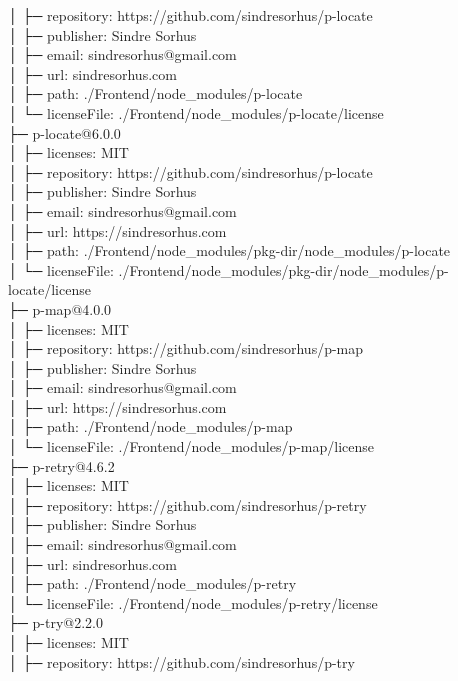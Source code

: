 │  ├─ repository: https://github.com/sindresorhus/p-locate\\
│  ├─ publisher: Sindre Sorhus\\
│  ├─ email: sindresorhus@gmail.com\\
│  ├─ url: sindresorhus.com\\
│  ├─ path: ./Frontend/node\_modules/p-locate\\
│  └─ licenseFile: ./Frontend/node\_modules/p-locate/license\\
├─ p-locate@6.0.0\\
│  ├─ licenses: MIT\\
│  ├─ repository: https://github.com/sindresorhus/p-locate\\
│  ├─ publisher: Sindre Sorhus\\
│  ├─ email: sindresorhus@gmail.com\\
│  ├─ url: https://sindresorhus.com\\
│  ├─ path: ./Frontend/node\_modules/pkg-dir/node\_modules/p-locate\\
│  └─ licenseFile: ./Frontend/node\_modules/pkg-dir/node\_modules/p-locate/license\\
├─ p-map@4.0.0\\
│  ├─ licenses: MIT\\
│  ├─ repository: https://github.com/sindresorhus/p-map\\
│  ├─ publisher: Sindre Sorhus\\
│  ├─ email: sindresorhus@gmail.com\\
│  ├─ url: https://sindresorhus.com\\
│  ├─ path: ./Frontend/node\_modules/p-map\\
│  └─ licenseFile: ./Frontend/node\_modules/p-map/license\\
├─ p-retry@4.6.2\\
│  ├─ licenses: MIT\\
│  ├─ repository: https://github.com/sindresorhus/p-retry\\
│  ├─ publisher: Sindre Sorhus\\
│  ├─ email: sindresorhus@gmail.com\\
│  ├─ url: sindresorhus.com\\
│  ├─ path: ./Frontend/node\_modules/p-retry\\
│  └─ licenseFile: ./Frontend/node\_modules/p-retry/license\\
├─ p-try@2.2.0\\
│  ├─ licenses: MIT\\
│  ├─ repository: https://github.com/sindresorhus/p-try\\
